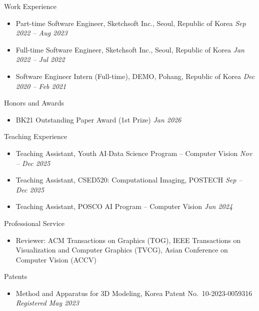 \documentclass{cv}
\begin{document}
\begin{rSection}{Work Experience}
\begin{itemize}
\item Part-time Software Engineer, Sketchsoft Inc., Seoul, Republic of Korea \hfill {\em Sep 2022 -- Aug 2023}
\item Full-time Software Engineer, Sketchsoft Inc., Seoul, Republic of Korea \hfill {\em Jan 2022 -- Jul 2022}
\item Software Engineer Intern (Full-time), DEMO, Pohang, Republic of Korea \hfill {\em Dec 2020 -- Feb 2021}
\end{itemize}
\end{rSection}

\begin{rSection}{Honors and Awards}
\begin{itemize}
\item BK21 Outstanding Paper Award (1st Prize) \hfill {\em Jan 2026}
\end{itemize}
\end{rSection}

\begin{rSection}{Teaching Experience}
\begin{itemize}
\item Teaching Assistant, Youth AI$\cdot$Data Science Program -- Computer Vision \hfill {\em Nov -- Dec 2025}
\item Teaching Assistant, CSED520: Computational Imaging, POSTECH \hfill {\em Sep -- Dec 2025}
\item Teaching Assistant, POSCO AI Program -- Computer Vision \hfill {\em Jun 2024}
\end{itemize}
\end{rSection}

\begin{rSection}{Professional Service}
\begin{itemize}
\item Reviewer: ACM Transactions on Graphics (TOG), IEEE Transactions on Visualization and Computer Graphics (TVCG), Asian Conference on Computer Vision (ACCV)
\end{itemize}
\end{rSection}

\begin{rSection}{Patents}
\begin{itemize}
\item Method and Apparatus for 3D Modeling, Korea Patent No.\ 10-2023-0059316 \hfill {\em Registered May 2023}
\end{itemize}
\end{rSection}
\end{document}
